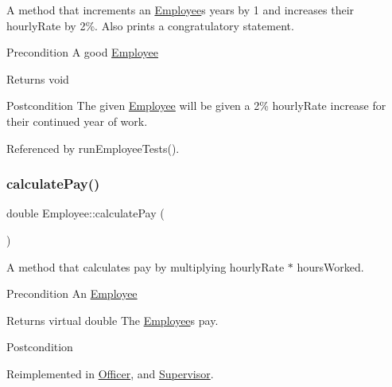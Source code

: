 A method that increments an \hyperlink{classEmployee}{Employee}\textquotesingle{}s years by 1 and increases their hourly\+Rate by 2\%. Also prints a congratulatory statement.

\begin{DoxyPrecond}{Precondition}
A good \hyperlink{classEmployee}{Employee} 
\end{DoxyPrecond}
\begin{DoxyReturn}{Returns}
void 
\end{DoxyReturn}
\begin{DoxyPostcond}{Postcondition}
The given \hyperlink{classEmployee}{Employee} will be given a 2\% hourly\+Rate increase for their continued year of work. 
\end{DoxyPostcond}


Referenced by run\+Employee\+Tests().

\mbox{\label{classEmployee_a01c2c44e15434237db28832f6972e960}} 
\subsubsection{\texorpdfstring{calculate\+Pay()}{calculatePay()}}
{\footnotesize\ttfamily double Employee\+::calculate\+Pay (\begin{DoxyParamCaption}{ }\end{DoxyParamCaption})\hspace{0.3cm}{\ttfamily [virtual]}}

A method that calculates pay by multiplying hourly\+Rate $\ast$ hours\+Worked.

\begin{DoxyPrecond}{Precondition}
An \hyperlink{classEmployee}{Employee} 
\end{DoxyPrecond}
\begin{DoxyReturn}{Returns}
virtual double The \hyperlink{classEmployee}{Employee}\textquotesingle{}s pay. 
\end{DoxyReturn}
\begin{DoxyPostcond}{Postcondition}

\end{DoxyPostcond}


Reimplemented in \hyperlink{classOfficer_a1fa1aad39b9e95be7a088990ebf17059}{Officer}, and \hyperlink{classSupervisor_aa37daa89523c08b84ae8141299e036f8}{Supervisor}.



